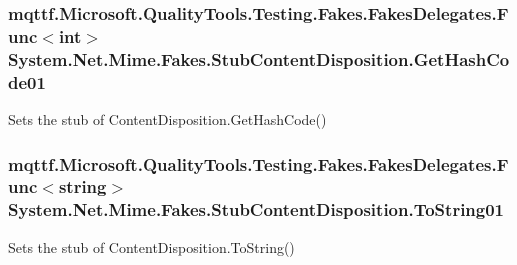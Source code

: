 \hypertarget{class_system_1_1_net_1_1_mime_1_1_fakes_1_1_stub_content_disposition_a4f7270d1fd3d95ca7898861bdc923af0}{
\subsubsection[{Get\-Hash\-Code01}]{\setlength{\rightskip}{0pt plus 5cm}mqttf.\-Microsoft.\-Quality\-Tools.\-Testing.\-Fakes.\-Fakes\-Delegates.\-Func$<$int$>$ System.\-Net.\-Mime.\-Fakes.\-Stub\-Content\-Disposition.\-Get\-Hash\-Code01}}\label{class_system_1_1_net_1_1_mime_1_1_fakes_1_1_stub_content_disposition_a4f7270d1fd3d95ca7898861bdc923af0}


Sets the stub of Content\-Disposition.\-Get\-Hash\-Code()

\hypertarget{class_system_1_1_net_1_1_mime_1_1_fakes_1_1_stub_content_disposition_aa3c609c9a6f04af71303ca36a4f4120c}{
\subsubsection[{To\-String01}]{\setlength{\rightskip}{0pt plus 5cm}mqttf.\-Microsoft.\-Quality\-Tools.\-Testing.\-Fakes.\-Fakes\-Delegates.\-Func$<$string$>$ System.\-Net.\-Mime.\-Fakes.\-Stub\-Content\-Disposition.\-To\-String01}}\label{class_system_1_1_net_1_1_mime_1_1_fakes_1_1_stub_content_disposition_aa3c609c9a6f04af71303ca36a4f4120c}


Sets the stub of Content\-Disposition.\-To\-String()




